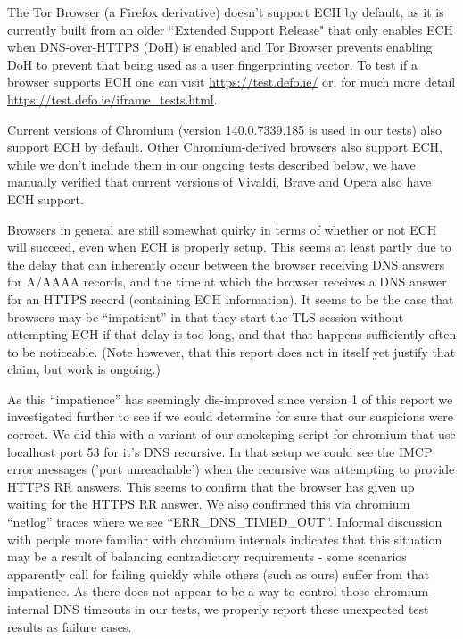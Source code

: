 The Tor Browser (a Firefox derivative) doesn't support ECH by default, as it
is currently built from an older ``Extended Support Release" that only
enables ECH when DNS-over-HTTPS (DoH) is enabled and Tor Browser prevents
enabling DoH to prevent that being used as a user fingerprinting vector.
To test if a browser supports ECH one can visit \url{https://test.defo.ie/}
or, for much more detail \url{https://test.defo.ie/iframe_tests.html}.

Current versions of Chromium (version 140.0.7339.185 is used in our tests)
also support ECH by default.
Other Chromium-derived browsers also support ECH, while we don't include them
in our ongoing tests described below, we have manually verified that current
versions of Vivaldi, Brave and Opera also have ECH support.

Browsers in general are still somewhat quirky in terms of whether or not
ECH will succeed, even when ECH is properly setup. This seems at least
partly due to the delay that can inherently occur between the browser
receiving DNS answers for A/AAAA records, and the time at which the
browser receives a DNS answer for an HTTPS record (containing ECH
information). It seems to be the case that browsers may be ``impatient''
in that they start the TLS session without attempting ECH if that
delay is too long, and that that happens sufficiently often to be
noticeable. (Note however, that this report does not in itself yet
justify that claim, but work is ongoing.)

As this ``impatience'' has seemingly dis-improved since version 1 of
this report we investigated further to see if we could determine for
sure that our suspicions were correct. We did this with a variant
of our smokeping script for chromium that use localhost port 53 for
it's DNS recursive. In that setup we could see the IMCP error messages
('port unreachable') when the recursive was attempting to provide HTTPS RR answers.
This seems to confirm that the browser has given up waiting for the HTTPS
RR answer. We also confirmed this via chromium ``netlog'' traces where
we see ``ERR\_DNS\_TIMED\_OUT''. Informal discussion with people more
familiar with chromium internals indicates that this situation may be
a result of balancing contradictory requirements - some scenarios 
apparently call for failing quickly while others (such as ours) suffer
from that impatience. As there does not appear to be a way to control
those chromium-internal DNS timeouts in our tests, we properly report
these unexpected test results as failure cases.

